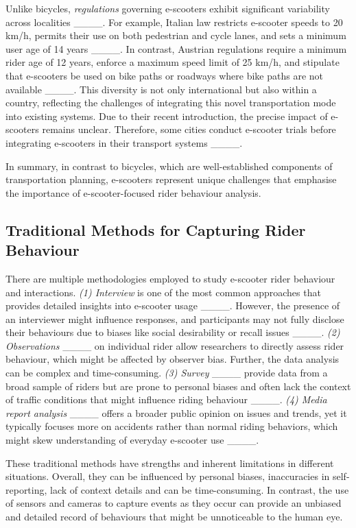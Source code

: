 Unlike bicycles, \textit{regulations} governing e-scooters exhibit significant variability across localities ____. For example, Italian law restricts e-scooter speeds to 20 km/h, permits their use on both pedestrian and cycle lanes, and sets a minimum user age of 14 years ____.  In contrast, Austrian regulations require a minimum rider age of 12 years, enforce a maximum speed limit of 25 km/h, and stipulate that e-scooters be used on bike paths or roadways where bike paths are not available ____. This diversity is not only international but also within a country, reflecting the challenges of integrating this novel transportation mode into existing systems. Due to their recent introduction, the precise impact of e-scooters remains unclear. Therefore, some cities conduct e-scooter trials before integrating e-scooters in their transport systems ____.

In summary, in contrast to bicycles, which are well-established components of transportation planning, e-scooters represent unique challenges that emphasise the importance of e-scooter-focused rider behaviour analysis.



    \subsection{Traditional Methods for Capturing Rider Behaviour}
There are multiple methodologies employed to study e-scooter rider behaviour and interactions. \textit{(1) Interview} is one of the most common approaches that provides detailed insights into e-scooter usage ____. However, the presence of an interviewer might influence responses, and participants may not fully disclose their behaviours due to biases like social desirability or recall issues ____. 
\textit{(2) Observations} ____ on individual rider allow researchers to directly assess rider behaviour, which might be affected by observer bias. Further, the data analysis can be complex and time-consuming. \textit{(3) Survey} ____ provide data from a broad sample of riders but are prone to personal biases and often lack the context of traffic conditions that might influence riding behaviour ____. \textit{(4) Media report analysis} ____ offers a broader public opinion on issues and trends, yet it typically focuses more on accidents rather than normal riding behaviors, which might skew understanding of everyday e-scooter use ____.

These traditional methods have strengths and inherent limitations in different situations. Overall, they can be influenced by personal biases, inaccuracies in self-reporting, lack of context details and can be time-consuming. In contrast, the use of sensors and cameras to capture events as they occur can provide an unbiased and detailed record of behaviours that might be unnoticeable to the human eye.

